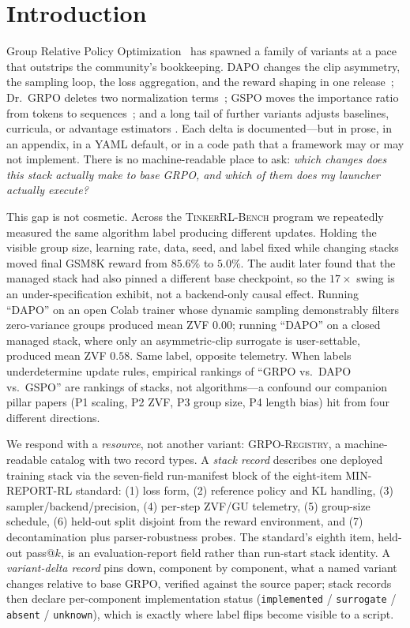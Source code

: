 \documentclass{article}
\newcommand{\ours}{\textsc{TinkerRL-Bench}}
\begin{document}
\section{Introduction}
\label{sec:p6-intro}
Group Relative Policy Optimization~\citep{shao2024deepseekmath, guo2025deepseekr1}
has spawned a family of variants at a pace that outstrips the community's
bookkeeping. DAPO changes the clip asymmetry, the sampling loop, the loss
aggregation, and the reward shaping in one release~\citep{yu2025dapo}; Dr.~GRPO
deletes two normalization terms~\citep{tong2025drgrpo}; GSPO moves the
importance ratio from tokens to sequences~\citep{qwen2025gspo}; and a long tail
of further variants adjusts baselines, curricula, or advantage estimators
\citep{lin2025cppo, nan2025ngrpo, zhang2025scaffgrpo, mcgrpo2025, gift2025,
liu2026gdpo, ichihara2025mogrpo, lu2025grpolead, bytedance2025vapo,
le2025rlzvp}. Each delta is documented---but in prose, in
an appendix, in a YAML default, or in a code path that a framework may or may
not implement. There is no machine-readable place to ask: \emph{which changes
does this stack actually make to base GRPO, and which of them does my launcher
actually execute?}

This gap is not cosmetic. Across the \ours{} program we repeatedly measured the
same algorithm label producing different updates. Holding the visible group
size, learning rate, data, seed, and label fixed while changing stacks moved
final GSM8K reward from $85.6\%$ to $5.0\%$. The audit later found that the
managed stack had also pinned a different base checkpoint, so the $17\times$
swing is an under-specification exhibit, not a backend-only causal effect.
Running ``DAPO'' on an open Colab trainer whose dynamic sampling
demonstrably filters zero-variance groups produced mean ZVF $0.00$; running
``DAPO'' on a closed managed stack, where only an asymmetric-clip surrogate is
user-settable, produced mean ZVF $0.58$. Same label, opposite telemetry. When
labels underdetermine update rules, empirical rankings of ``GRPO vs.\ DAPO
vs.\ GSPO'' are rankings of stacks, not algorithms---a confound our companion
pillar papers (P1 scaling, P2 ZVF, P3 group size, P4 length bias) hit from four
different directions.

We respond with a \emph{resource}, not another variant:
\textsc{GRPO-Registry}, a machine-readable catalog with two record types.
A \emph{stack record} describes one deployed training stack via the seven-field
run-manifest block of the eight-item MIN-REPORT-RL standard: (1) loss form, (2) reference policy
and KL handling, (3) sampler/backend/precision, (4) per-step ZVF/GU telemetry,
(5) group-size schedule, (6) held-out split disjoint from the reward
environment, and (7) decontamination plus parser-robustness probes. The
standard's eighth item, held-out pass@$k$, is an evaluation-report field rather
than run-start stack identity. A
\emph{variant-delta record} pins down, component by component, what a named
variant changes relative to base GRPO, verified against the source paper; stack
records then declare per-component implementation status
(\texttt{implemented} / \texttt{surrogate} / \texttt{absent} / \texttt{unknown}),
which is exactly where label flips become visible to a script.
\end{document}
